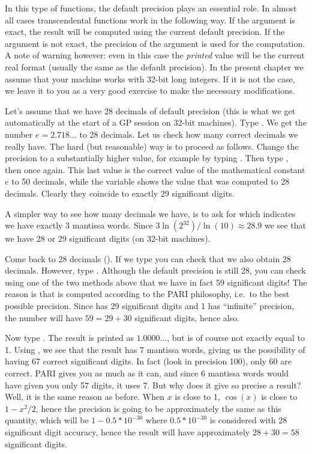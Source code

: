 In this type of functions, the default precision plays an essential role.
In almost all cases transcendental functions work in the following way.
If the argument is exact, the result will be computed using the current
default precision. If the argument is not exact, the precision of the
argument is used for the computation. A note of warning however: even in this
case the {\it printed\/} value will be the current real format (usually the
same as the default precision). In the present chapter we assume that your
machine works with 32-bit long integers. If it is not the case, we leave it
to you as a very good exercise to make the necessary modifications.

Let's assume that we have 28 decimals of default precision (this is what we
get automatically at the start of a GP session on 32-bit machines). Type
. We get the number $e=2.718\dots$ to 28 decimals. Let us check
how many correct decimals we really have. The hard (but reasonable) way is to
proceed as follows. Change the precision to a substantially higher value, for
example by typing . Then type , then  once
again. This last value is the correct value of the mathematical constant $e$ to
50 decimals, while the variable  shows the value that was computed to 28
decimals. Clearly they coincide to exactly 29 significant digits.

A simpler way to see how many decimals we have, is to ask for 
which indicates we have exactly $3$ mantissa words. Since
$3\ln(2^{32}) / \ln(10)\approx28.9$ we see that we have 28 or 29 significant
digits (on 32-bit machines).

\smallskip
Come back to 28 decimals (). If we type 
you can check that we also obtain 28 decimals. However, type
. Although the default precision is still 28,
you can check using one of the two methods above that we have in fact 59
significant digits! The reason is that  is computed
according to the PARI philosophy, i.e.~to the best possible precision. Since
 has 29 significant digits and 1 has ``infinite'' precision, the
number  will have $59=29+30$ significant digits,
hence  also.

Now type . The result is printed as $1.0000\dots$, but
is of course not exactly equal to 1. Using , we see that the
result has 7 mantissa words, giving us the possibility of having 67
correct significant digits. In fact (look in precision 100), only 60 are
correct. PARI gives you as much as it can, and since 6 mantissa words
would have given you only 57 digits, it uses 7. But why does it give so
precise a result? Well, it is the same reason as before. When $x$ is close
to 1, $\cos(x)$ is close to $1-x^2/2$, hence the precision is going to be
approximately the same as this quantity, which will be $1-0.5*10^{-30}$ where
$0.5*10^{-30}$ is considered with 28 significant digit accuracy, hence the
result will have approximately $28+30=58$ significant digits.

